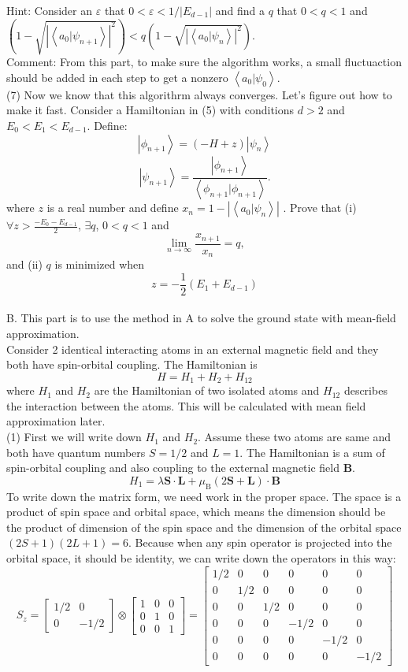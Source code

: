 \documentclass[letter]{article}
\begin{document}
\indent Hint: Consider an $\varepsilon$ that $0<\varepsilon<1/|E_{d-1}|$ and find a $q$ that $0<q<1$ and $\left(1-\sqrt{\left|\left<a_0|\psi_{n+1}\right>\right|^2}\right)<q\left(1-\sqrt{\left|\left<a_0|\psi_{n}\right>\right|^2}\right)$.\\
\indent Comment: From this part, to make sure the algorithm works, a small fluctuaction should be added in each step to get a nonzero $\left<a_0|\psi_0\right>$.\\
\indent (7) Now we know that this algorithrm always converges. Let's figure out how to make it fast. Consider a Hamiltonian in (5) with conditions $d>2$ and $E_0<E_1<E_{d-1}$. Define:$$\left|\phi_{n+1}\right>=\left(-H+z\right) \left|\psi_n\right>$$
$$\left|\psi_{n+1}\right>=\frac{\left|\phi_{n+1}\right>}{\left<\phi_{n+1}|\phi_{n+1}\right>}.$$
where $z$ is a real number and define $x_n=1-\left|\left<a_0|\psi_n\right>\right|$
. Prove that (i) $\forall z >\frac{-E_0-E_{d-1}}{2}$, $\exists q$, $0< q <1$ and $$
\lim _{n\rightarrow \infty} \frac{x_{n+1}}{x_n}=q,
$$
and (ii) $q$ is minimized when $$z=-\frac{1}{2}\left(E_1+E_{d-1}\right)$$\\
B. This part is to use the method in A to solve the ground state with mean-field approximation. \\
\indent Consider 2 identical interacting atoms in an external magnetic field and they both have spin-orbital coupling. The Hamiltonian is 
$$
H=H_1+H_2+H_{12}
$$
where $H_1$ and $H_2$ are the Hamiltonian of two isolated atoms and $H_{12}$ describes the interaction between the atoms. This will be calculated with mean field approximation later. \\
\indent (1) First we will write down $H_{1}$ and $H_2$. Assume these two atoms are same and both have quantum numbers $S=1/2$ and $L=1$. The Hamiltonian is a sum of spin-orbital coupling and also coupling to the external magnetic field $\bm{B}$.
$$H_1=\lambda \bm{S}\cdot\bm{L}+\mu_{\mathrm{B}}(2\bm{S}+\bm{L})\cdot\bm{B}
$$
To write down the matrix form, we need work in the proper space. The space is a product of spin space and orbital space, which means the dimension should be the product of dimension of the spin space and the dimension of the orbital space $(2S+1)(2L+1)=6$. Because when any spin operator is projected into the orbital space, it should be identity, we can write down the operators in this way:
$$S_z=\begin{bmatrix}
1/2 & 0\\
0 & -1/2
\end{bmatrix} \otimes \begin{bmatrix}
1 &0 &0\\
0 & 1 & 0 \\
0 &0 &1
\end{bmatrix}=\begin{bmatrix}
1/2 &0 &0 &0 &0 &0\\
0 &1/2 &0 &0 &0 &0\\
0 &0 &1/2 &0 &0 &0\\
0 &0 &0 &-1/2 &0 &0\\
0 &0 &0 &0 &-1/2 &0\\
0 &0 &0 &0 &0 &-1/2
\end{bmatrix}
$$
\end{document}
